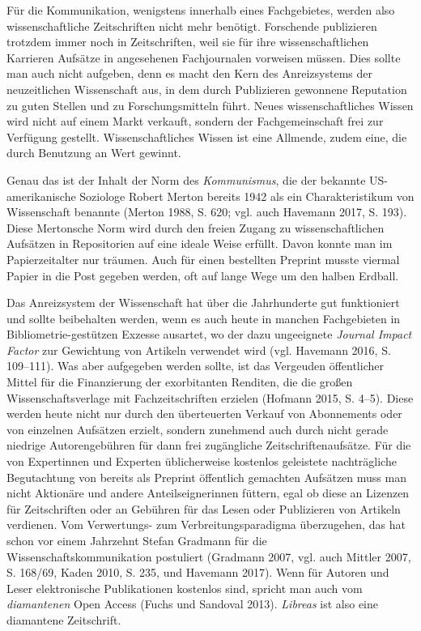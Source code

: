 \documentclass[a4paper,
fontsize=11pt,
oneside,
numbers=noperiodatend,
parskip=half-,
bibliography=totoc,
final
]{scrartcl}
\begin{document}
Für die Kommunikation, wenigstens innerhalb eines Fachgebietes, werden
also wissenschaftliche Zeitschriften nicht mehr benötigt. Forschende
publizieren trotzdem immer noch in Zeitschriften, weil sie für ihre
wissenschaftlichen Karrieren Aufsätze in angesehenen Fachjournalen
vorweisen müssen. Dies sollte man auch nicht aufgeben, denn es macht den
Kern des Anreizsystems der neuzeitlichen Wissenschaft aus, in dem durch
Publizieren gewonnene Reputation zu guten Stellen und zu
Forschungsmitteln führt. Neues wissenschaftliches Wissen wird nicht auf
einem Markt verkauft, sondern der Fachgemeinschaft frei zur Verfügung
gestellt. Wissenschaftliches Wissen ist eine Allmende, zudem eine, die
durch Benutzung an Wert gewinnt.

Genau das ist der Inhalt der Norm des \emph{Kommunismus}, die der
bekannte US-amerikanische Soziologe Robert Merton bereits 1942 als ein
Charakteristikum von Wissenschaft benannte (Merton 1988, S. 620; vgl.
auch Havemann 2017, S. 193). Diese Mertonsche Norm wird durch den freien
Zugang zu wissenschaftlichen Aufsätzen in Repositorien auf eine ideale
Weise erfüllt. Davon konnte man im Papierzeitalter nur träumen. Auch für
einen bestellten Preprint musste viermal Papier in die Post gegeben
werden, oft auf lange Wege um den halben Erdball.

Das Anreizsystem der Wissenschaft hat über die Jahrhunderte gut
funktioniert und sollte beibehalten werden, wenn es auch heute in
manchen Fachgebieten in Bibliometrie-gestützen Exzesse ausartet, wo der
dazu ungeeignete \emph{Journal Impact Factor} zur Gewichtung von
Artikeln verwendet wird (vgl. Havemann 2016, S. 109--111). Was aber
aufgegeben werden sollte, ist das Vergeuden öffentlicher Mittel für die
Finanzierung der exorbitanten Renditen, die die großen
Wissenschaftsverlage mit Fachzeitschriften erzielen (Hofmann 2015, S.
4--5). Diese werden heute nicht nur durch den überteuerten Verkauf von
Abonnements oder von einzelnen Aufsätzen erzielt, sondern zunehmend auch
durch nicht gerade niedrige Autorengebühren für dann frei zugängliche
Zeitschriftenaufsätze. Für die von Expertinnen und Experten
üblicherweise kostenlos geleistete nachträgliche Begutachtung von
bereits als Preprint öffentlich gemachten Aufsätzen muss man nicht
Aktionäre und andere Anteilseignerinnen füttern, egal ob diese an
Lizenzen für Zeitschriften oder an Gebühren für das Lesen oder
Publizieren von Artikeln verdienen. Vom Verwertungs- zum
Verbreitungsparadigma überzugehen, das hat schon vor einem Jahrzehnt
Stefan Gradmann für die Wissenschaftskommunikation postuliert (Gradmann
2007, vgl. auch Mittler 2007, S. 168/69, Kaden 2010, S. 235, und
Havemann 2017). Wenn für Autoren und Leser elektronische Publikationen
kostenlos sind, spricht man auch vom \emph{diamantenen} Open Access
(Fuchs und Sandoval 2013). \emph{Libreas} ist also eine diamantene
Zeitschrift.
\end{document}

